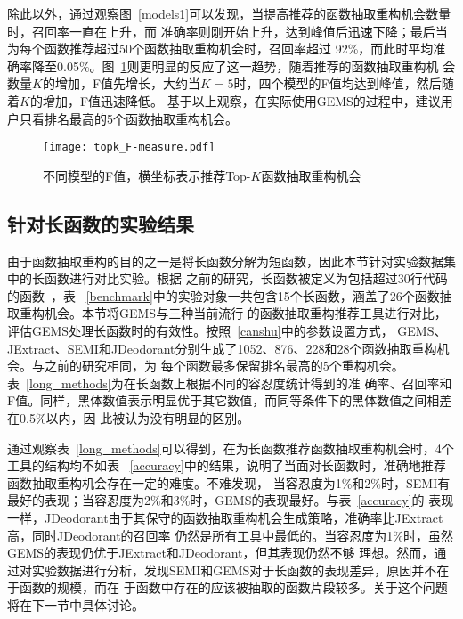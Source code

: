 除此以外，通过观察图~\ref{models1}可以发现，当提高推荐的函数抽取重构机会数量时，召回率一直在上升，而
准确率则刚开始上升，达到峰值后迅速下降；最后当为每个函数推荐超过50个函数抽取重构机会时，召回率超过
92\%，而此时平均准确率降至0.05\%。图~\ref{models2}则更明显的反应了这一趋势，随着推荐的函数抽取重构机
会数量$K$的增加，F值先增长，大约当$K=5$时，四个模型的F值均达到峰值，然后随着$K$的增加，F值迅速降低。
基于以上观察，在实际使用GEMS的过程中，建议用户只看排名最高的5个函数抽取重构机会。

\begin{figure}
\centering
\texttt{[image: topk\_F-measure.pdf]}
\caption{不同模型的F值，横坐标表示推荐Top-$K$函数抽取重构机会}
\label{models2}
\end{figure}

\subsection{针对长函数的实验结果}\label{RQ4}
由于函数抽取重构的目的之一是将长函数分解为短函数，因此本节针对实验数据集中的长函数进行对比实验。根据
之前的研究，长函数被定义为包括超过30行代码的函数~\cite{charalampidou2016identifying}，表
~\ref{benchmark}中的实验对象一共包含15个长函数，涵盖了26个函数抽取重构机会。本节将GEMS与三种当前流行
的函数抽取重构推荐工具进行对比，评估GEMS处理长函数时的有效性。按照~\ref{canshu}中的参数设置方式，
GEMS、JExtract、SEMI和JDeodorant分别生成了1052、876、228和28个函数抽取重构机会。与之前的研究相同，为
每个函数最多保留排名最高的5个重构机会。表~\ref{long_methods}为在长函数上根据不同的容忍度统计得到的准
确率、召回率和F值。同样，黑体数值表示明显优于其它数值，而同等条件下的黑体数值之间相差在0.5\%以内，因
此被认为没有明显的区别。

通过观察表~\ref{long_methods}可以得到，在为长函数推荐函数抽取重构机会时，4个工具的结构均不如表
~\ref{accuracy}中的结果，说明了当面对长函数时，准确地推荐函数抽取重构机会存在一定的难度。不难发现，
当容忍度为1\%和2\%时，SEMI有最好的表现；当容忍度为2\%和3\%时，GEMS的表现最好。与表~\ref{accuracy}的
表现一样，JDeodorant由于其保守的函数抽取重构机会生成策略，准确率比JExtract高，同时JDeodorant的召回率
仍然是所有工具中最低的。当容忍度为1\%时，虽然GEMS的表现仍优于JExtract和JDeodorant，但其表现仍然不够
理想。然而，通过对实验数据进行分析，发现SEMI和GEMS对于长函数的表现差异，原因并不在于函数的规模，而在
于函数中存在的应该被抽取的函数片段较多。关于这个问题将在下一节中具体讨论。

